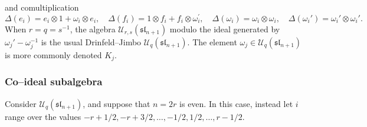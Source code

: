 \documentclass[12pt]{ximera}
\begin{document}
and comultiplication 
$$
\Delta\left(e_{i}\right)=e_{i} \otimes 1+\omega_{i} \otimes e_{i}, \quad \Delta\left(f_{i}\right)=1 \otimes f_{i}+f_{i} \otimes \omega_{i}^{\prime}, \quad \Delta(\omega_i)=\omega_i \otimes \omega_i, \quad \Delta(\omega_i')=\omega_i' \otimes \omega_i'.
$$
When $r=q=s^{-1}$, the algebra $\mathcal{U}_{r,s}(\mathfrak{sl}_{n+1})$ modulo the ideal generated by $\omega_j'-\omega_j^{-1}$ is the usual Drinfeld--Jimbo $\mathcal{U}_q(\mathfrak{sl}_{n+1})$. The element $\omega_j \in \mathcal{U}_q(\mathfrak{sl}_{n+1})$ is more commonly denoted $K_j$.

\subsubsection{Co--ideal subalgebra}
Consider $\mathcal{U}_q(\mathfrak{sl}_{n+1})$, and suppose that $n=2r$ is even. In this case, instead let $i$ range over the values $-r+1/2,-r+3/2,\ldots,-1/2,1/2,\ldots,r-1/2$.
\end{document}
